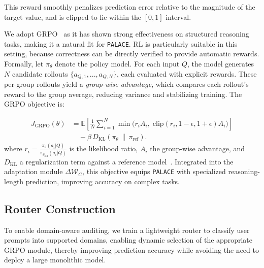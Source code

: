 \documentclass[pdflatex,sn-mathphys-num]{sn-jnl}%
\newcommand{\n}{\texttt{PALACE}\xspace}
\theoremstyle{thmstyleone}%
\theoremstyle{thmstyletwo}%
\theoremstyle{thmstylethree}%
\begin{document}
This reward smoothly penalizes prediction error relative to the magnitude of the target value, and is clipped to lie within the $[0, 1]$ interval.


We adopt GRPO~\citep{shao2024deepseekmath} as it has shown strong effectiveness on structured reasoning tasks, making it a natural fit for {\n}. RL is particularly suitable in this setting, because correctness can be directly verified to provide automatic rewards. Formally, let $\pi_\theta$ denote the policy model. For each input $Q$, the model generates $N$ candidate rollouts $\{a_{Q,1},...,a_{Q,N}\}$, each evaluated with explicit rewards. These per-group rollouts yield a \textit{group-wise advantage}, which compares each rollout’s reward to the group average, reducing variance and stabilizing training. The GRPO objective is:

{\small
\begin{equation}
\begin{aligned}
J_{\text{GRPO}}(\theta)
&= \mathbb{E}\!\left[
\frac{1}{N}\sum_{i=1}^N
\min\!\Big(
r_i A_i,\;
\mathrm{clip}(r_i, 1-\epsilon, 1+\epsilon)A_i
\Big)
\right] \\
&\quad - \beta\, D_{\text{KL}}\!\left(\pi_\theta \,\|\, \pi_{\text{ref}}\right).
\end{aligned}
\end{equation}}
where $r_i=\tfrac{\pi_\theta(a_i|Q)}{\pi_{\theta_{\text{old}}}(a_i|Q)}$ is the likelihood ratio, $A_i$ the group-wise advantage, and $D_{\text{KL}}$ a regularization term against a reference model~\citep{ouyang2022training}.
Integrated into the adaptation module $\Delta \mathcal{W}_C$, this objective equips {\n} with specialized reasoning-length prediction, improving accuracy on complex tasks.


\subsection{Router Construction}

To enable domain-aware auditing, we train a lightweight router to classify user prompts into supported domains, enabling dynamic selection of the appropriate GRPO module, thereby improving prediction accuracy while avoiding the need to deploy a large monolithic model.
\end{document}
